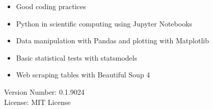 \documentclass{book}
\newcommand{\booklicense}{MIT License}
\newcommand{\bookversion}{0.1.9024}
\begin{document}
\begin{titlepage}
\begin{flushleft}
\begin{tcolorbox}[skin = widget, boxrule = 1mm, coltitle = white, colframe = white, colback = white, width=(\textwidth), before=\hfill, after=\hfill]
\begin{itemize}
    \item Good coding practices
    \item Python in scientific computing using Jupyter Notebooks
    \item Data manipulation with Pandas and plotting with Matplotlib
    \item Basic statistical tests with statsmodels
    \item Web scraping tables with Beautiful Soup 4
\end{itemize}
\vspace{5mm}
Version Number: \bookversion\\
License: \booklicense
\end{tcolorbox}
\end{flushleft}
\end{titlepage}
\restoregeometry
\end{document}
